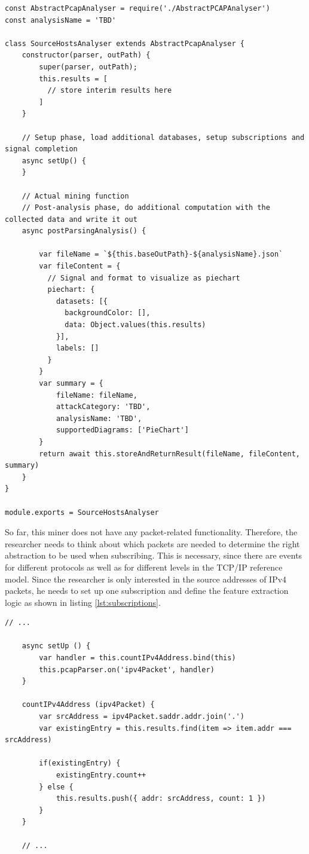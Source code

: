 \begin{lstlisting}[caption={Initial content of the newly create Miner},label={lst:initialtemplate}]
const AbstractPcapAnalyser = require('./AbstractPCAPAnalyser')
const analysisName = 'TBD'

class SourceHostsAnalyser extends AbstractPcapAnalyser {
    constructor(parser, outPath) {
        super(parser, outPath);
        this.results = [
          // store interim results here
        ]
    }

    // Setup phase, load additional databases, setup subscriptions and signal completion
    async setUp() {
    }

    // Actual mining function
    // Post-analysis phase, do additional computation with the collected data and write it out
    async postParsingAnalysis() {

        var fileName = `${this.baseOutPath}-${analysisName}.json`
        var fileContent = {
          // Signal and format to visualize as piechart
          piechart: {
            datasets: [{
              backgroundColor: [],
              data: Object.values(this.results)
            }],
            labels: []
          }
        }
        var summary = {
            fileName: fileName,
            attackCategory: 'TBD',
            analysisName: 'TBD',
            supportedDiagrams: ['PieChart']
        }
        return await this.storeAndReturnResult(fileName, fileContent, summary)
    }
}

module.exports = SourceHostsAnalyser

\end{lstlisting}

So far, this miner does not have any packet-related functionality. Therefore, the researcher needs to think about which packets are needed to determine the right abstraction to be used when subscribing. This is necessary, since there are events for different protocols as well as for different levels in the TCP/IP reference model. Since the researcher is only interested in the source addresses of IPv4 packets, he needs to set up one subscription and define the feature extraction logic as shown in listing \ref{lst:subscriptions}.

\begin{lstlisting}[caption={Creating a subscription and mining source addresses},label={lst:subscriptions}]
    // ...
    
    async setUp () {
        var handler = this.countIPv4Address.bind(this)
        this.pcapParser.on('ipv4Packet', handler)
    }

    countIPv4Address (ipv4Packet) {
        var srcAddress = ipv4Packet.saddr.addr.join('.')
        var existingEntry = this.results.find(item => item.addr === srcAddress)

        if(existingEntry) {
            existingEntry.count++
        } else {
            this.results.push({ addr: srcAddress, count: 1 })
        }
    }
    
    // ...
 

\end{lstlisting}

